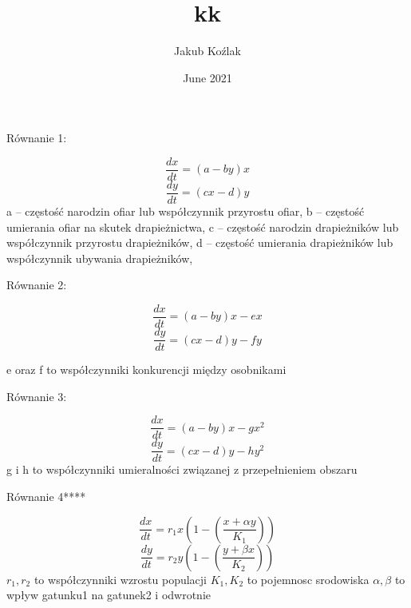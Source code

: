 \documentclass{article}
\title{kk}
\author{Jakub Koźlak}
\date{June 2021}
\begin{document}
\maketitle


Równanie 1:

$$
\frac{dx}{dt} = (a - by)x
$$
$$
\frac{dy}{dt} = (cx - d)y
$$
a – częstość narodzin ofiar lub współczynnik przyrostu ofiar,\newline
b – częstość umierania ofiar na skutek drapieżnictwa,
\newline
c – częstość narodzin drapieżników lub współczynnik przyrostu drapieżników,\newline
d – częstość umierania drapieżników lub współczynnik ubywania drapieżników,\newline

Równanie 2:

$$
\frac{dx}{dt} = (a - by)x -ex
$$
$$
\frac{dy}{dt} = (cx - d)y-fy
$$

e oraz f to współczynniki konkurencji między osobnikami


Równanie 3:


$$
\frac{dx}{dt} = (a - by)x -gx^2
$$
$$
\frac{dy}{dt} = (cx - d)y-hy^2
$$
g i h to współczynniki umieralności związanej z przepełnieniem obszaru


Równanie 4****

$$
\frac{dx}{dt} = r_1x\left(1- \left(\frac{x+\alpha y}{K_1}\right) \right)
$$
$$
\frac{dy}{dt} = r_2y\left(1- \left(\frac{y+\beta x}{K_2}\right) \right)
$$
$r_1, r_2$ to współczynniki wzrostu populacji\newline
$K_1, K_2$ to pojemnosc srodowiska
$\alpha, \beta$ to wpływ gatunku1 na gatunek2 i odwrotnie
\end{document}
